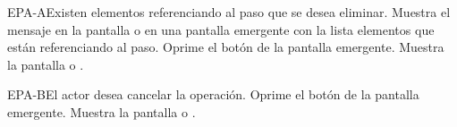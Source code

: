 	\begin{UCtrayectoriaA}{EPA-A}{Existen elementos referenciando al paso que se desea eliminar.}
		\UCpaso[\UCsist] Muestra el mensaje  en la pantalla  o  en una pantalla emergente con la lista elementos que están referenciando al paso.
		\UCpaso[\UCactor] Oprime el botón  de la pantalla emergente.
		\UCpaso[\UCsist] Muestra la pantalla  o .
	\end{UCtrayectoriaA}

	\begin{UCtrayectoriaA}{EPA-B}{El actor desea cancelar la operación.}
		\UCpaso[\UCactor] Oprime el botón  de la pantalla emergente.
		\UCpaso[\UCsist] Muestra la pantalla  o .
	\end{UCtrayectoriaA}
	

